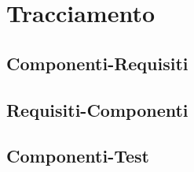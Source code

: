 \documentclass[a4paper, titlepage]{article}
\begin{document}
\section{Tracciamento}

\subsection{Componenti-Requisiti}


\subsection{Requisiti-Componenti}


\subsection{Componenti-Test}
\end{document}
